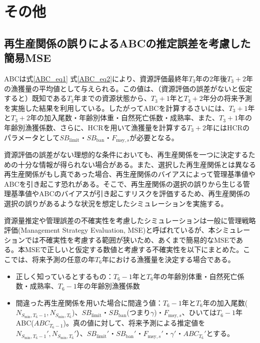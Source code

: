 \documentclass[11pt]{jsarticle}
\begin{document}
\section{その他}
\subsection{再生産関係の誤りによるABCの推定誤差を考慮した簡易MSE\label{sec:mse}}

ABCは式\ref{ABC_eq1} 式\ref{ABC_eq2}により、資源評価最終年$T_3$年の2年後$T_3+2$年の漁獲量の平均値として与えられる。この値は、（資源評価の誤差がないと仮定すると）既知である$T_3$年までの資源状態から、$T_3+1$年と$T_3+2$年分の将来予測を実施した結果を利用している。したがってABCを計算するさいには、$T_3+1$年と$T_3+2$年の加入尾数・年齢別体重・自然死亡係数・成熟率、また、$T_3+1$年の年齢別漁獲係数、さらに、HCRを用いて漁獲量を計算する$T_3+2$年にはHCRのパラメータとして$S\!B_{\mathrm{limit}}$・$S\!B_{\mathrm{ban}}$・$F_{\mathrm{msy},s}$が必要となる。

資源評価の誤差がない理想的な条件においても、再生産関係を一つに決定するための十分な情報が得られない場合がある。また、選択した再生産関係とは異なる再生産関係がもし真であった場合、再生産関係のバイアスによって管理基準値やABCを引き起こす恐れがある。そこで、再生産関係の選択の誤りから生じる管理基準値やABCのバイアスが引き起こすリスクを評価するため、再生産関係の選択の誤りがあるような状況を想定したシミュレーションを実施する。

資源量推定や管理誤差の不確実性を考慮したシミュレーションは一般に管理戦略評価(Management Strategy Evaluation, MSE)と呼ばれているが\cite{punt}、本シミュレーションでは不確実性を考慮する範囲が狭いため、あくまで簡易的なMSEである。本MSEで正しいと仮定する数値と考慮する不確実性を以下にまとめた。ここでは、将来予測の任意の年$T_6$年における漁獲量を決定する場合である。
\begin{itemize}
\item 正しく知っているとするもの：$T_6-1$年と$T_6$年の年齢別体重・自然死亡係数・成熟率、$T_6-1$年の年齢別漁獲係数
\item 間違った再生産関係を用いた場合に間違う値：$T_6-1$年と$T_6$年の加入尾数($N_{S_{\mathrm{min}},T_6 -1}, N_{S_{\mathrm{min}},T_6}$)、$S\!B_{\mathrm{limit}}$・$S\!B_{\mathrm{ban}}$(つまり$\gamma$)・$F_{\mathrm{msy},s}$、ひいては$T_6-1$年ABC($ABC_{T_6-1}$)。真の値に対して、将来予測による推定値を$N_{S_{\mathrm{min}},T_6-1}', N_{S_{\mathrm{min}},T_6}'$）、$S\!B_{\mathrm{limit}}'$・$S\!B_{\mathrm{ban}}'$・$F_{\mathrm{msy},s}'$・$\gamma'$・$ABC_{T_6}'$とする。
\end{itemize}
\end{document}
